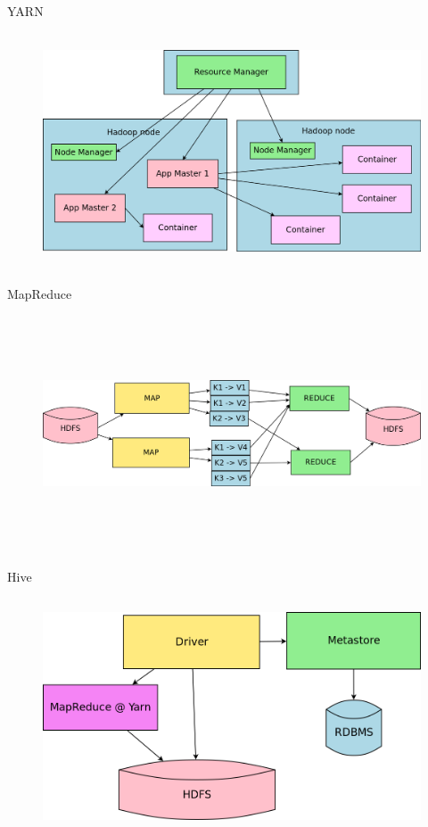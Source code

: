 \documentclass{beamer}
\begin{document}
\begin{frame}{YARN}
	\begin{figure}
		\includegraphics[width=\textwidth,height=7cm,keepaspectratio=true]{yarn}
	\end{figure}
\end{frame}
\begin{frame}{MapReduce}
	\begin{figure}
		\includegraphics[width=\textwidth,height=7cm,keepaspectratio=true]{mapreduce}
	\end{figure}
\end{frame}
\begin{frame}{Hive}
	\begin{figure}
		\includegraphics[width=\textwidth,height=7cm,keepaspectratio=true]{hive}
	\end{figure}
\end{frame}
\end{document}
